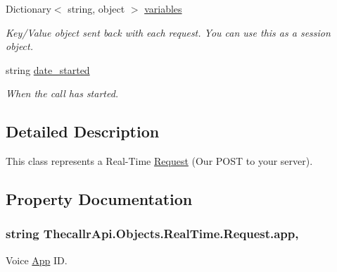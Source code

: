 \begin{DoxyCompactItemize}
Dictionary$<$ string, object $>$ \hyperlink{class_thecallr_api_1_1_objects_1_1_real_time_1_1_request_afc3423f28ec2b5f75b5ba4f9919eb61b}{variables}
\begin{DoxyCompactList}\small\item\em Key/\+Value object sent back with each request. You can use this as a session object. \end{DoxyCompactList}\item 
string \hyperlink{class_thecallr_api_1_1_objects_1_1_real_time_1_1_request_a61d31ceb1bd9faa206feabc5dc28822c}{date\+\_\+started}
\begin{DoxyCompactList}\small\item\em When the call has started. \end{DoxyCompactList}\end{DoxyCompactItemize}


\subsection{Detailed Description}
This class represents a Real-\/\+Time \hyperlink{class_thecallr_api_1_1_objects_1_1_real_time_1_1_request}{Request} (Our P\+O\+S\+T to your server). 



\subsection{Property Documentation}
\hypertarget{class_thecallr_api_1_1_objects_1_1_real_time_1_1_request_a3679a1e4a3a2cadd4cd9b120b508d701}{
\subsubsection[{app}]{\setlength{\rightskip}{0pt plus 5cm}string Thecallr\+Api.\+Objects.\+Real\+Time.\+Request.\+app\hspace{0.3cm}{\ttfamily [get]}, {\ttfamily [set]}}}\label{class_thecallr_api_1_1_objects_1_1_real_time_1_1_request_a3679a1e4a3a2cadd4cd9b120b508d701}


Voice \hyperlink{namespace_thecallr_api_1_1_objects_1_1_app}{App} I\+D. 


